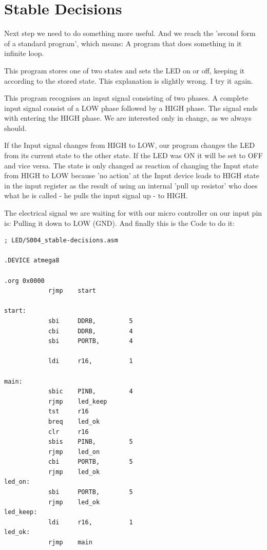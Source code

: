 \section{Stable Decisions}

Next step we need to do something more useful. And we reach the 'second form of a standard program', which means: A program that does something in it infinite loop.

This program stores one of two states and sets the LED on or off, keeping it according to the stored state. This explanation is slightly wrong. I try it again.

This program recognises an input signal consisting of two phases. A complete input signal consist of a LOW phase followed by a HIGH phase. The signal ends with entering the HIGH phase. We are interested only in change, as we always should.

If the Input signal changes from HIGH to LOW, our program changes the LED from its current state to the other state. If the LED was ON it will be set to OFF and vice versa. The state is only changed as reaction of changing the Input state from HIGH to LOW because 'no action' at the Input device leads to HIGH state in the input register as the result of using an internal 'pull up resistor' who does what he is called - he pulls the input signal up - to HIGH.

The electrical signal we are waiting for with our micro controller on our input pin is: Pulling it down to LOW (GND). And finally this is the Code to do it:

\begin{lstlisting}
; LED/S004_stable-decisions.asm

.DEVICE atmega8

.org 0x0000
            rjmp    start

start:
            sbi     DDRB,         5
            cbi     DDRB,         4
            sbi     PORTB,        4

            ldi     r16,          1

main:
            sbic    PINB,         4
            rjmp    led_keep
            tst     r16
            breq    led_ok
            clr     r16
            sbis    PINB,         5
            rjmp    led_on
            cbi     PORTB,        5
            rjmp    led_ok
led_on:
            sbi     PORTB,        5
            rjmp    led_ok
led_keep:
            ldi     r16,          1
led_ok:
            rjmp    main
\end{lstlisting}


